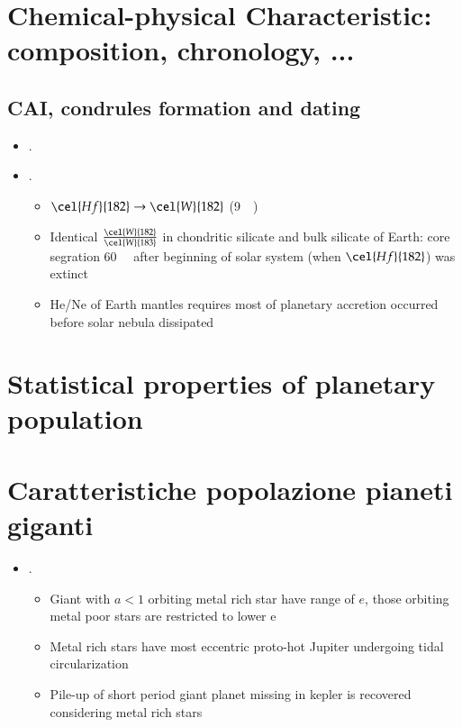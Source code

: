 \documentclass[main.tex]{subfiles}
\begin{document}
\chapter{Chemical-physical Characteristic: composition, chronology, ...}

\section{CAI, condrules formation and dating}

\begin{itemize}
    \item \cite{bollard2017early}. 
    \item \cite{yin2002short}.
    \begin{itemize}
        \item $\cel{Hf}{182}\to\cel{W}{182}$ (\SI{9}{\mega\year})
        \item Identical $\frac{\cel{W}{182}}{\cel{W}{183}}$ in chondritic silicate and bulk silicate of Earth: core segration \SI{60}{\mega\year} after beginning of solar system (when $\cel{Hf}{182}$) was extinct
        \item He/Ne of Earth mantles requires most of planetary accretion occurred before solar nebula dissipated
    \end{itemize}
\end{itemize}


\chapter{Statistical properties of planetary population}

\chapter{Caratteristiche popolazione pianeti giganti}

\begin{itemize}
    \item \cite{dawson2013giant}.
    \begin{itemize}
        \item Giant with $a<1$ orbiting metal rich star have range of $e$, those orbiting metal poor stars are restricted to lower e
        \item Metal rich stars have most eccentric proto-hot Jupiter undergoing tidal circularization
        \item Pile-up of short period giant planet missing in kepler is recovered considering metal rich stars
    \end{itemize}
\end{itemize}
\end{document}
